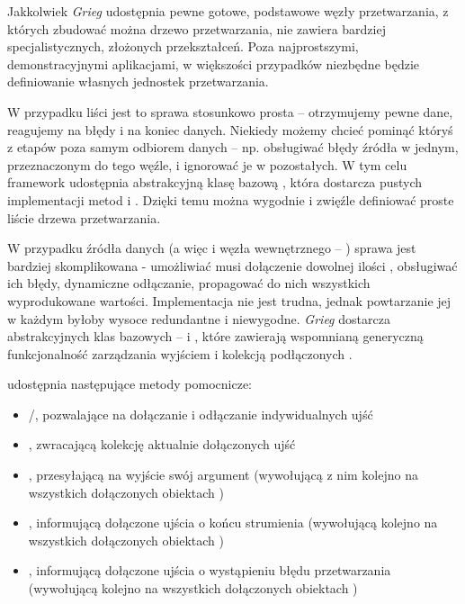 Jakkolwiek \emph{Grieg} udostępnia pewne gotowe, podstawowe węzły przetwarzania, z których zbudować
można drzewo przetwarzania, nie zawiera bardziej specjalistycznych, złożonych przekształceń. Poza
najprostszymi, demonstracyjnymi aplikacjami, w większości przypadków niezbędne będzie definiowanie
własnych jednostek przetwarzania.

W przypadku liści jest to sprawa stosunkowo prosta -- otrzymujemy pewne dane, reagujemy na błędy i
na koniec danych. Niekiedy możemy chcieć pominąć któryś z etapów poza samym odbiorem danych -- np.
obsługiwać błędy źródła w jednym, przeznaczonym do tego węźle, i ignorować je w pozostałych. W tym
celu framework udostępnia abstrakcyjną klasę bazową , która dostarcza pustych
implementacji metod  i . Dzięki temu można wygodnie i zwięźle definiować
proste liście drzewa przetwarzania.

W przypadku źródła danych (a więc i węzła wewnętrznego -- ) sprawa jest bardziej
skomplikowana - umożliwiać musi dołączenie dowolnej ilości , obsługiwać ich błędy,
dynamiczne odłączanie, propagować do nich wszystkich wyprodukowane wartości. Implementacja nie jest
trudna, jednak powtarzanie jej w każdym  byłoby wysoce redundantne i niewygodne.
\emph{Grieg} dostarcza abstrakcyjnych klas bazowych --  i
, które zawierają wspomnianą generyczną funkcjonalność zarządzania wyjściem
i kolekcją podłączonych .

 udostępnia następujące metody pomocnicze:

\begin{itemize}

  \item {}/, pozwalające na dołączanie i odłączanie indywidualnych ujść

  \item {}, zwracającą kolekcję aktualnie dołączonych ujść

  \item {}, przesyłającą na wyjście swój argument (wywołującą z nim 
    kolejno na wszystkich dołączonych obiektach )

  \item {}, informującą dołączone ujścia o końcu strumienia (wywołującą
     kolejno na wszystkich dołączonych obiektach )

  \item {}, informującą dołączone ujścia o wystąpieniu błędu przetwarzania
    (wywołującą  kolejno na wszystkich dołączonych obiektach )

\end{itemize}

